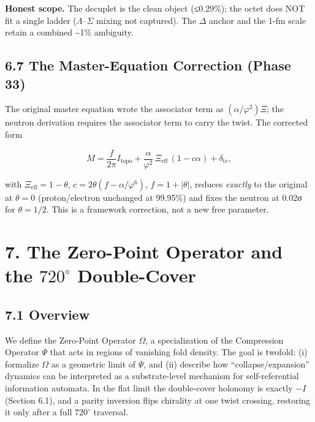 \documentclass[
  11pt,
]{article}
\begin{document}
\textbf{Honest scope.} The decuplet is the clean object (≤0.29\%); the
octet does NOT fit a single ladder (\(\Lambda\)--\(\Sigma\) mixing not
captured). The \(\Delta\) anchor and the 1-fm scale retain a combined
\textasciitilde1\% ambiguity.

\subsection{6.7 The Master-Equation Correction (Phase
33)}\label{the-master-equation-correction-phase-33}

The original master equation wrote the associator term as
\((\alpha/\varphi^2)\Xi\); the neutron derivation requires the
associator term to carry the twist. The corrected form

\[M = \frac{f}{2\pi}I_{\text{topo}} + \frac{\alpha}{\varphi^2}\,\Xi_{\text{eff}}\,(1 - c\alpha) + \delta_{\text{tc}},\]

with \(\Xi_{\text{eff}} = 1 - \theta\),
\(c = 2\theta(f - \alpha/\varphi^6)\), \(f = 1 + |\theta|\), reduces
\emph{exactly} to the original at \(\theta = 0\) (proton/electron
unchanged at 99.95\%) and fixes the neutron at 0.02σ for
\(\theta = 1/2\). This is a framework correction, not a new free
parameter.

\section{\texorpdfstring{7. The Zero-Point Operator and the
\(720^{\circ}\)
Double-Cover}{7. The Zero-Point Operator and the 720\^{}\{\textbackslash circ\} Double-Cover}}\label{the-zero-point-operator-and-the-720circ-double-cover}

\subsection{7.1 Overview}\label{overview-2}

We define the Zero-Point Operator \(\Omega\), a specialization of the
Compression Operator \(\Psi\) that acts in regions of vanishing fold
density. The goal is twofold: (i) formalize \(\Omega\) as a geometric
limit of \(\Psi\), and (ii) describe how ``collapse/expansion'' dynamics
can be interpreted as a substrate-level mechanism for self-referential
information automata. In the flat limit the double-cover holonomy is
exactly \(-I\) (Section 6.1), and a parity inversion flips chirality at
one twist crossing, restoring it only after a full \(720^{\circ}\)
traversal.
\end{document}
